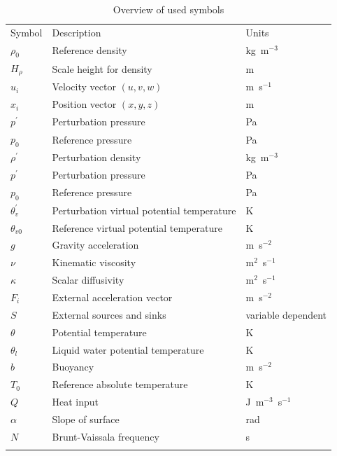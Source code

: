 \documentclass[gmd]{copernicus}
\begin{document}
\begin{table}[t]
\caption{Overview of used symbols}\label{tab:symbols}
\begin{tabular}{lll}
\tophline
Symbol & Description & Units \\
\middlehline
$\rho_0$ & Reference density & kg~m$^{-3}$\\
$H_\rho$ & Scale height for density & m\\
$u_i$  & Velocity vector $\left( u, v, w \right)$ & m~s$^{-1}$\\
$x_i$  & Position vector $\left( x, y, z \right)$ & m\\
$p^\prime$ & Perturbation pressure & Pa\\
$p_0$ & Reference pressure & Pa\\
$\rho^\prime$ & Perturbation density & kg~m$^{-3}$ \\
$p^\prime$ & Perturbation pressure & Pa\\
$p_0$ & Reference pressure & Pa\\
$\theta_v^\prime$ & Perturbation virtual potential temperature & K\\
$\theta_{v0}$ & Reference virtual potential temperature & K\\
$g$ & Gravity acceleration & m~s$^{-2}$\\
$\nu$ & Kinematic viscosity & m$^{2}$~s$^{-1}$\\
$\kappa$ & Scalar diffusivity & m$^{2}$~s$^{-1}$\\
$F_i$ & External acceleration vector &  m~s$^{-2}$\\
$S$ & External sources and sinks & variable dependent\\
$\theta$ & Potential temperature & K \\
$\theta_l$ & Liquid water potential temperature & K\\
$b$ & Buoyancy & m~s$^{-2}$\\
$T_0$ & Reference absolute temperature & K\\
$Q$ & Heat input & J~m$^{-3}$~s$^{-1}$\\
$\alpha$ & Slope of surface & rad \\
$N$ & Brunt-Vaissala frequency & s\\
\bottomhline
\end{tabular}
\end{table}




%
\nopagebreak

\smallskip
\end{document}
